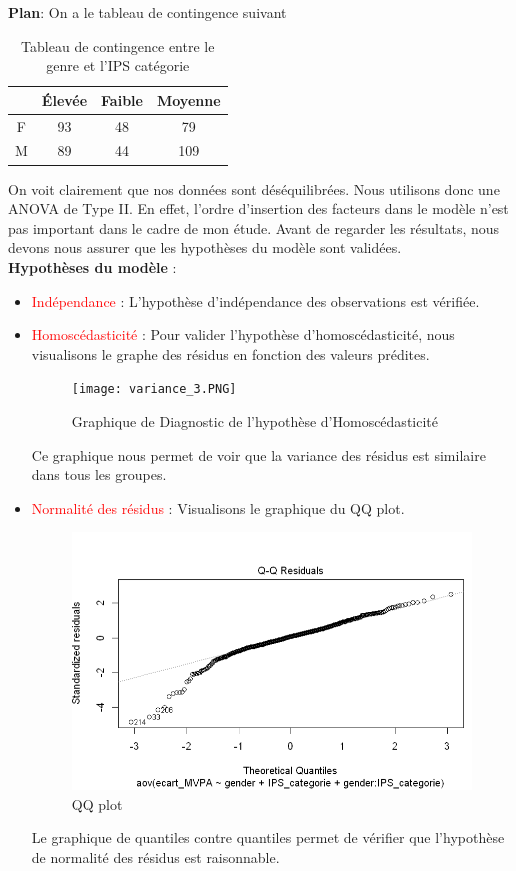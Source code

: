 \documentclass[12pt,a4paper]{article}
\begin{document}
	\textbf{Plan}: On a le tableau de contingence suivant
	\begin{table}[H]
		\centering
		\begin{tabular}{cccc}
			\toprule
			& Élevée & Faible & Moyenne \\
			\midrule
			F & 93 & 48 & 79 \\
			M & 89 & 44 & 109 \\
			\bottomrule
		\end{tabular}
		\caption{Tableau de contingence entre le genre et l'IPS catégorie}
		\label{table:1}
	\end{table}
	On voit clairement que nos données sont déséquilibrées. Nous utilisons donc une ANOVA de Type II. En effet, l'ordre d'insertion des facteurs dans le modèle n'est pas important dans le cadre de mon étude.
	Avant de regarder les résultats, nous devons nous assurer que les hypothèses du modèle sont validées.\\
	\textbf{Hypothèses du modèle} :
	\begin{itemize}
		\item \textcolor{red}{Indépendance} : L'hypothèse d'indépendance des observations est vérifiée.
		\item \textcolor{red}{Homoscédasticité} : 
		Pour valider l'hypothèse d'homoscédasticité, nous visualisons le graphe des résidus en fonction des valeurs prédites.
		\begin{figure}[H]
			\centering
			\texttt{[image: variance\_3.PNG]}
			\caption{Graphique de Diagnostic de l'hypothèse d'Homoscédasticité}
			\label{fig:variance2}
		\end{figure}
		Ce graphique nous permet de voir que la variance des résidus est similaire dans tous les groupes.
		\item \textcolor{red}{Normalité des résidus} : 
		Visualisons le graphique du QQ plot.
		\begin{figure}[H]
			\centering
			\includegraphics[width=\linewidth]{Normalité_3.PNG}
			\caption{QQ plot}
			\label{fig:qq_plot2}
		\end{figure}
		Le graphique de quantiles contre quantiles permet de vérifier que l'hypothèse de normalité des résidus est raisonnable.
	\end{itemize}
	
\end{document}
